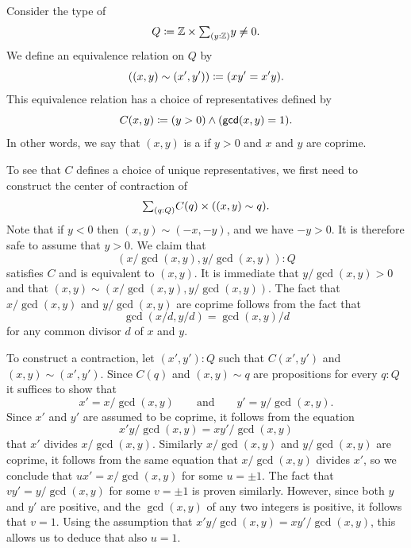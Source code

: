 \begin{eg}
  Consider the type of 
  \begin{equation*}
    Q\defeq \Z\times\sm{y:\Z}y\neq 0.
  \end{equation*}
  We define an equivalence relation on $Q$ by
  \begin{equation*}
    ((x,y)\sim (x',y'))\coloneqq (xy'=x'y).
  \end{equation*}
  This equivalence relation has a choice of representatives defined by
  \begin{equation*}
    C(x,y)\coloneqq (y>0)\land (\mathsf{gcd}(x,y)=1). 
  \end{equation*}
  In other words, we say that $(x,y)$ is a  if $y>0$ and $x$ and $y$ are coprime. 

  To see that $C$ defines a choice of unique representatives, we first need to construct the center of contraction of
  \begin{equation*}
    \sm{q:Q}C(q)\times ((x,y)\sim q).
  \end{equation*}
  Note that if $y<0$ then $(x,y)\sim (-x,-y)$, and we have $-y>0$. It is therefore safe to assume that $y>0$. We claim that
  \begin{equation*}
    (x/\gcd(x,y),y/\gcd(x,y)):Q
  \end{equation*}
  satisfies $C$ and is equivalent to $(x,y)$. It is immediate that $y/\gcd(x,y)>0$ and that $(x,y)\sim(x/\gcd(x,y),y/\gcd(x,y))$. The fact that $x/\gcd(x,y)$ and $y/\gcd(x,y)$ are coprime follows from the fact that
  \begin{equation*}
    \gcd(x/d,y/d)=\gcd(x,y)/d
  \end{equation*}
  for any common divisor $d$ of $x$ and $y$. 
  
  To construct a contraction, let $(x',y'):Q$ such that $C(x',y')$ and $(x,y)\sim (x',y')$. Since $C(q)$ and $(x,y)\sim q$ are propositions for every $q:Q$ it suffices to show that
  \begin{equation*}
    x'=x/\gcd(x,y)\qquad\text{and}\qquad y'=y/\gcd(x,y).
  \end{equation*}
  Since $x'$ and $y'$ are assumed to be coprime, it follows from the equation
  \begin{equation*}
    x'y/\gcd(x,y)=xy'/\gcd(x,y)
  \end{equation*}
  that $x'$ divides $x/\gcd(x,y)$. Similarly $x/\gcd(x,y)$ and $y/\gcd(x,y)$ are coprime, it follows from the same equation that $x/\gcd(x,y)$ divides $x'$, so we conclude that $ux'=x/\gcd(x,y)$ for some $u=\pm 1$. The fact that $vy'=y/\gcd(x,y)$ for some $v=\pm 1$ is proven similarly. However, since both $y$ and $y'$ are positive, and the $\gcd(x,y)$ of any two integers is positive, it follows that $v=1$. Using the assumption that $x'y/\gcd(x,y)=xy'/\gcd(x,y)$, this allows us to deduce that also $u=1$.


\end{eg}

